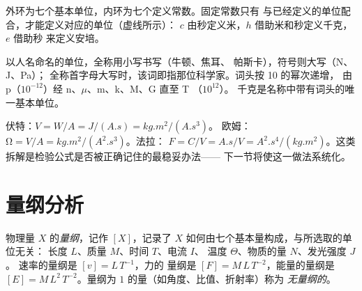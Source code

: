 \begin{omfigure}

{\small 外环为七个基本单位，内环为七个定义常数。固定常数只有
与已经定义的单位配合，才能定义对应的单位（虚线所示）：
$c$ 由秒定义米，$h$ 借助米和秒定义千克，
$e$ 借助秒
来定义安培。}
\end{omfigure}

\begin{remark}[名称与符号]\label{rem:b1:units-dimensions:names}
以人名命名的单位，全称用小写书写（牛顿、焦耳、
帕斯卡），符号则大写（\unit{N}、\unit{J}、\unit{Pa}）；
全称首字母大写时，该词即指那位科学家。词头按 10 的幂次递增，
由 p（$10^{-12}$）经 n、$\mu$、m、k、M、G 直至 T
（$10^{12}$）。
千克是名称中带有词头的唯一基本单位。
\end{remark}

\begin{example}[拆解导出单位]\label{ex:b1:units-dimensions:unpack}
伏特：$\unit{V} = \unit{W/A} = \unit{J/(A.s)} = \unit{kg.m^2/(A.s^3)}$。
欧姆：$\unit{\ohm} = \unit{V/A} = \unit{kg.m^2/(A^2.s^3)}$。法拉：
$\unit{F} = \unit{C/V} = \unit{A.s/V} = \unit{A^2.s^4/(kg.m^2)}$。这类
拆解是检验公式是否被正确记住的最稳妥办法——
下一节将使这一做法系统化。
\end{example}

\section{量纲分析}

\begin{definition}[量纲]\label{def:b1:units-dimensions:dimension}
物理量 $X$ 的\emph{量纲}，记作 $[X]$，记录了 $X$
如何由七个基本量构成，与所选取的单位无关：
长度 $L$、质量 $M$、时间 $T$、电流 $I$、
温度 $\Theta$、物质的量 $N$、发光强度 $J$。
速率的量纲是 $[v] = L\,T^{-1}$，力的
量纲是 $[F] = M\,L\,T^{-2}$，能量的量纲是 $[E] = M\,L^2\,T^{-2}$。量纲为
$1$ 的量（如角度、比值、折射率）称为
\emph{无量纲的}。
\end{definition}

